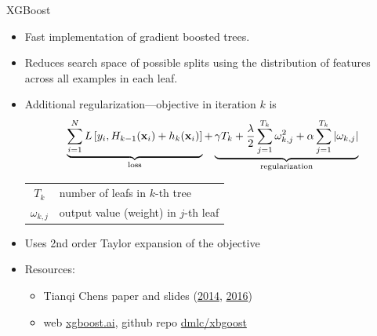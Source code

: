 \documentclass[handout]{beamer}
\begin{document}
\begin{frame}{XGBoost}
	\begin{itemize}[<+>]
		\item Fast implementation of gradient boosted trees.
		
		\item Reduces search space of possible splits using the distribution of features across all examples in each leaf.
		
		\item Additional regularization---objective in iteration $ k $ is
		\begin{gather*}
			\underbrace{\sum_{i=1}^N L\left[
				y_i, H_{k-1}(\mathrm{\mathbf{x}}_i) + h_k(\mathrm{\mathbf{x}}_i)
			\right]}_\text{loss}
			+ \underbrace{\gamma T_k 
				+ \frac{\lambda}{2} \sum_{j=1}^{T_k} \omega_{k, j}^2
				+ \alpha \sum_{j=1}^{T_k} |\omega_{k, j}|}_\text{regularization}
		\end{gather*}
		\begin{tabular}{cl}
			$ T_k $ & number of leafs in $ k $-th tree \\
			$ \omega_{k, j} $ & output value (weight) in $ j $-th leaf
		\end{tabular}
	
		\item Uses 2nd order Taylor expansion of the objective
	
		\item Resources:
		\begin{itemize}[<.>]
			\item Tianqi Chens paper \cite{ChenGuestrin2016} and slides (\href{https://homes.cs.washington.edu/~tqchen/pdf/BoostedTree.pdf}{2014}, \href{https://speakerdeck.com/datasciencela/tianqi-chen-xgboost-overview-and-latest-news-la-meetup-talk}{2016})
			
			\item web \href{https://xgboost.ai/}{xgboost.ai}, github repo \href{https://github.com/dmlc/xgboost}{dmlc/xbgoost}
		\end{itemize}
	\end{itemize}
\end{frame}
\end{document}
